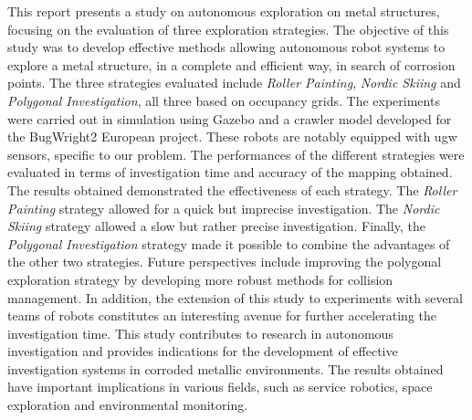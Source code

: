 
\begin{summary}

	This report presents a study on autonomous exploration on metal structures, focusing on the evaluation of three exploration strategies.
	The objective of this study was to develop effective methods allowing autonomous robot systems to explore a metal structure, in a complete and efficient way, in search of corrosion points.
	The three strategies evaluated include \textit{Roller Painting}, \textit{Nordic Skiing} and \textit{Polygonal Investigation}, all three based on occupancy grids.
	The experiments were carried out in simulation using Gazebo and a crawler model developed for the BugWright2 European project.
	These robots are notably equipped with \gls{ugw} sensors, specific to our problem.
	The performances of the different strategies were evaluated in terms of investigation time and accuracy of the mapping obtained.
	The results obtained demonstrated the effectiveness of each strategy.
	The \textit{Roller Painting} strategy allowed for a quick but imprecise investigation.
	The \textit{Nordic Skiing} strategy allowed a slow but rather precise investigation.
	Finally, the \textit{Polygonal Investigation} strategy made it possible to combine the advantages of the other two strategies.
	Future perspectives include improving the polygonal exploration strategy by developing more robust methods for collision management.
	In addition, the extension of this study to experiments with several teams of robots constitutes an interesting avenue for further accelerating the investigation time.
	This study contributes to research in autonomous investigation and provides indications for the development of effective investigation systems in corroded metallic environments.
	The results obtained have important implications in various fields, such as service robotics, space exploration and environmental monitoring.

\end{summary}

